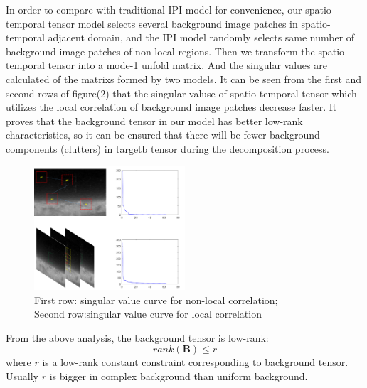 \documentclass[journal]{IEEEtran}
\begin{document}
In order to compare with traditional IPI model for convenience, our spatio-temporal tensor model selects several background image patches in spatio-temporal adjacent domain, and the IPI model randomly selects same number of background image patches of non-local regions. Then we transform the spatio-temporal tensor into a mode-1 unfold matrix. And the singular values are calculated of the matrixs formed by two models. It can be seen from the first and second rows of figure(2) that the singular valuse of spatio-temporal tensor which utilizes the local correlation of background image patches decrease faster. It proves that the background tensor in our model has better low-rank characteristics, so it can be ensured that there will be fewer background components (clutters) in targetb tensor during the decomposition process.
\begin{figure}[H]
  \centering
  \includegraphics[width=0.5\textwidth]{singular.png}
  \caption{First row: singular value curve for non-local correlation;\\Second row:singular value curve for local correlation}
  \label{singular}
\end{figure}

From the above analysis, the background tensor is low-rank:
\begin{equation}
  rank(\bm{B}) \leq r
\end{equation}
where $r$ is a low-rank constant constraint corresponding to background tensor. Usually $r$ is bigger in complex background than uniform background.
\end{document}
